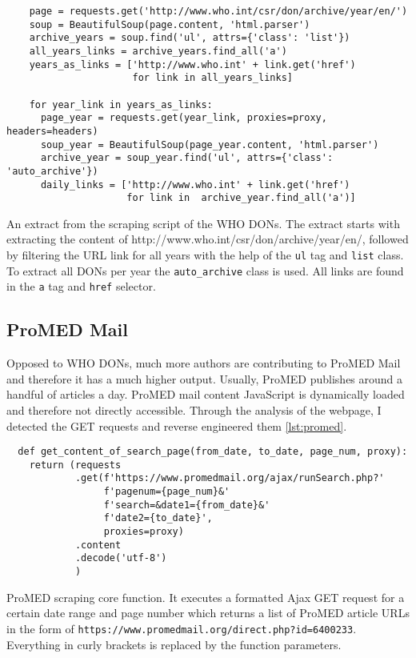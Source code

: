 \begin{listing}[h]
  \begin{verbatim}
    page = requests.get('http://www.who.int/csr/don/archive/year/en/')
    soup = BeautifulSoup(page.content, 'html.parser')
    archive_years = soup.find('ul', attrs={'class': 'list'})
    all_years_links = archive_years.find_all('a')
    years_as_links = ['http://www.who.int' + link.get('href')
                      for link in all_years_links]

    for year_link in years_as_links:
      page_year = requests.get(year_link, proxies=proxy, headers=headers)
      soup_year = BeautifulSoup(page_year.content, 'html.parser')
      archive_year = soup_year.find('ul', attrs={'class': 'auto_archive'})
      daily_links = ['http://www.who.int' + link.get('href')
                     for link in  archive_year.find_all('a')]
  \end{verbatim}
  \caption{An extract from the scraping script of the WHO DONs. The extract starts with extracting the content of \textquotesingle http://www.who.int/csr/don/archive/year/en/\textquotesingle, followed by filtering the URL link for all years with the help of the \texttt{ul} tag and \texttt{list} class. To extract all DONs per year the \texttt{auto\_archive} class is used. All links are found in the \texttt{a} tag and \texttt{href} selector.}
  \label{lst:who}
\end{listing}

\subsection{ProMED Mail}
Opposed to WHO DONs, much more authors are contributing to ProMED Mail and therefore it has a much higher output. Usually, ProMED publishes around a handful of articles a day. ProMED mail content JavaScript is dynamically loaded and therefore not directly accessible. Through the analysis of the webpage, I detected the GET requests and reverse engineered them \ref{lst:promed}.

\begin{listing}[h!]
  \begin{verbatim}
  def get_content_of_search_page(from_date, to_date, page_num, proxy):
    return (requests
            .get(f'https://www.promedmail.org/ajax/runSearch.php?'
                 f'pagenum={page_num}&'
                 f'search=&date1={from_date}&'
                 f'date2={to_date}',
                 proxies=proxy)
            .content
            .decode('utf-8')
            )
  \end{verbatim}
  \caption{ProMED scraping core function. It executes a formatted Ajax GET request for a certain date range and page number which returns a list of ProMED article URLs in the form of \textquotesingle \texttt{https://www.promedmail.org/direct.php?id=6400233}\textquotesingle. Everything in curly brackets is replaced by the function parameters.}
  \label{lst:promed}
\end{listing}

